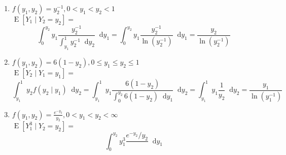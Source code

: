 \documentclass{article}
\newcommand{\expt}[1]{\operatorname{E}[#1]}
\newcommand*\diff{\mathop{}\!\mathrm{d}}
\newcommand{\intv}[4]{\int_{#3}^{#4} #1 \diff #2}
\begin{document}
\begin{enumerate}
  \item $f(y_1, y_2) = y_2^{-1}, 0 < y_1 < y_2 < 1$\\
  $\expt{Y_1 \mid Y_2 = y_2} = $\[
    \intv{ y_1\frac{y_2^{-1}}{\intv{ y_2^{-1} }{y_2}{y_1}{1}} }{y_1}{0}{y_2}
    = \intv{ y_1\frac{y_2^{-1}}{\ln (y_2^{-1})} }{y_1}{0}{y_2}
    = \frac{y_2}{\ln(y_2^{-1})}
  \]
  \item $f(y_1, y_2) = 6(1-y_2), 0 \leq y_1 \leq y_2 \leq 1$\\
  $\expt{Y_2 \mid Y_1 = y_1} = $\[
    \intv{y_2 f(y_2 \mid y_1) }{y_2}{y_1}{1}
    = \intv{y_1 \frac{6(1-y_2)}{ \intv{6(1-y_2)}{y_1}{0}{y_2} } }{y_2}{y_1}{1}
    = \intv{y_1 \frac{1}{y_2 } }{y_2}{y_1}{1}
    = \frac{y_1}{\ln(y_1^{-1})}
  \]

  \item $f(y_1, y_2) = \frac{e^{-y_2}}{y_2}, 0 < y_1 < y_2 < \infty$\\
  $\expt{Y_1^3 \mid Y_2 = y_2} = $ \[
    \intv{ y_1^3 \frac{e^{-y_2}/y_2}{} }{y_1}{0}{y_2}
  \]
\end{enumerate}
\end{document}
